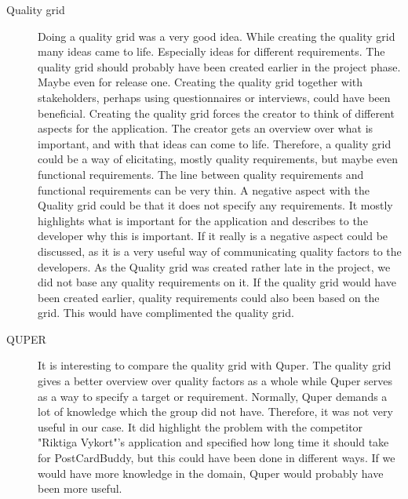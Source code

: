 \documentclass[10pt,a4paper]{article}
\begin{document}
\begin{description}
\item[Quality grid]
Doing a quality grid was a very good idea. While creating the quality grid many ideas came to life. Especially ideas for different requirements.
The quality grid should probably have been created earlier in the project phase. Maybe even for release one. Creating the quality grid together with stakeholders, perhaps using questionnaires or interviews, could have been beneficial. Creating the quality grid forces the creator to think of different aspects for the application. The creator gets an overview over what is important, and with that ideas can come to life. Therefore, a quality grid could be a way of elicitating, mostly quality requirements, but maybe even functional requirements. The line between quality requirements and functional requirements can be very thin. A negative aspect with the Quality grid could be that it does not specify any requirements. It mostly highlights what is important for the application and describes to the developer why this is important. If it really is a negative aspect could be discussed, as it is a very useful way of communicating quality factors to the developers. As the Quality grid was created rather late in the project, we did not base any quality requirements on it. If the quality grid would have been created earlier, quality requirements could also been based on the grid. This would have complimented the quality grid.



\item[QUPER]
It is interesting to compare the quality grid with Quper. The quality grid gives a better overview over quality factors as a whole while Quper serves as a way to specify a target or requirement. Normally, Quper demands a lot of knowledge which the group did not have. Therefore, it was not very useful in our case. It did highlight the problem with the competitor "Riktiga Vykort"'s application and specified how long time it should take for PostCardBuddy, but this could have been done in different ways. If we would have more knowledge in the domain, Quper would probably have been more useful.


\end{description}




\end{document}
